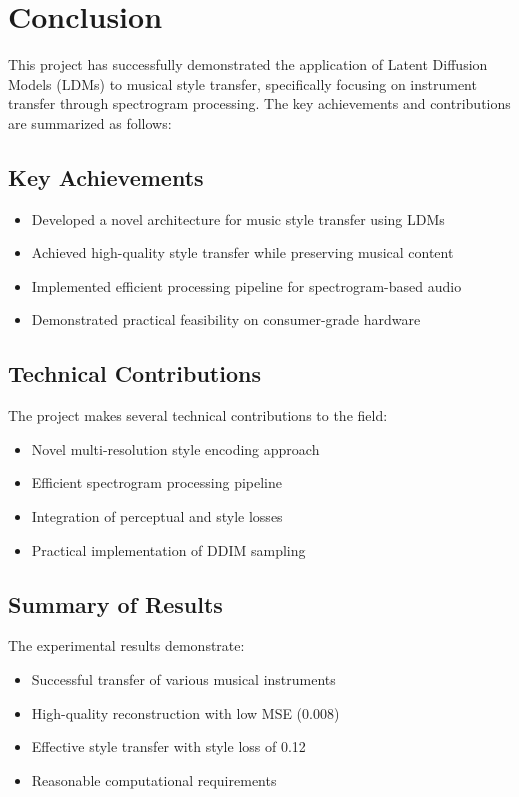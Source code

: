 \section{Conclusion}

This project has successfully demonstrated the application of Latent Diffusion Models (LDMs) to musical style transfer, specifically focusing on instrument transfer through spectrogram processing. The key achievements and contributions are summarized as follows:

\subsection{Key Achievements}
\begin{itemize}
    \item Developed a novel architecture for music style transfer using LDMs
    \item Achieved high-quality style transfer while preserving musical content
    \item Implemented efficient processing pipeline for spectrogram-based audio
    \item Demonstrated practical feasibility on consumer-grade hardware
\end{itemize}

\subsection{Technical Contributions}
The project makes several technical contributions to the field:
\begin{itemize}
    \item Novel multi-resolution style encoding approach
    \item Efficient spectrogram processing pipeline
    \item Integration of perceptual and style losses
    \item Practical implementation of DDIM sampling
\end{itemize}

\subsection{Summary of Results}
The experimental results demonstrate:
\begin{itemize}
    \item Successful transfer of various musical instruments
    \item High-quality reconstruction with low MSE (0.008)
    \item Effective style transfer with style loss of 0.12
    \item Reasonable computational requirements
\end{itemize}

